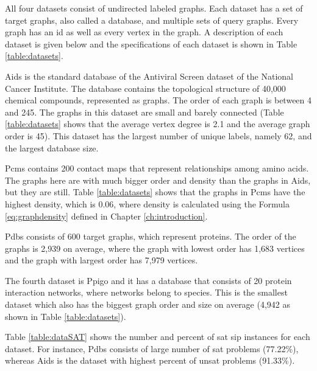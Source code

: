\documentclass{l4proj}
\begin{document}
All four datasets consist of undirected labeled graphs. Each dataset has a set of target graphs, also called a database, and multiple sets of query graphs. Every graph has an id as well as every vertex in the graph. A description of each dataset is given below and the specifications of each dataset is shown in Table \ref{table:datasets}.

Aids is the standard database of the Antiviral Screen dataset of the National Cancer Institute. The database contains the topological structure of 40,000 chemical compounds, represented as graphs. The order of each graph is between 4 and 245. The graphs in this dataset are small and barely connected (Table \ref{table:datasets} shows that the average vertex degree is 2.1 and the average graph order is 45). This dataset has the largest number of unique labels, namely 62, and the largest database size.

Pcms contains 200 contact maps that represent relationships among amino acids. The graphs here are with much bigger order and density than the graphs in Aids, but they are still. Table \ref{table:datasets} shows that the graphs in Pcms have the highest density, which is 0.06, where density is calculated using the Formula \ref{eq:graphdensity} defined in Chapter \ref{ch:introduction}. 

Pdbs consists of 600 target graphs, which represent proteins. The order of the graphs is 2,939 on average, where the graph with lowest order has 1,683 vertices and the graph with largest order has 7,979 vertices.

The fourth dataset is Ppigo and it has a database that consists of 20 protein interaction networks, where networks belong to species. This is the smallest dataset which also has the biggest graph order and size on average (4,942 as shown in Table \ref{table:datasets}).

Table \ref{table:dataSAT} shows the number and percent of \gls{sat} \gls{sip} instances for each dataset. For instance, Pdbs consists of large number of \gls{sat} problems (77.22\%), whereas Aids is the dataset with highest percent of \gls{unsat} problems (91.33\%).
\end{document}
